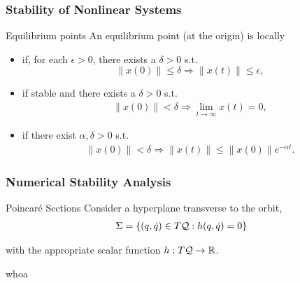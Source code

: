 \begin{frame}
  \frametitle{Stability of Nonlinear Systems}
  \begin{block}{Equilibrium points}
    An equilibrium point (at the origin) is locally
    \begin{itemize}
      \item {} if, for each $\epsilon > 0$, there exists a $\delta > 0$ s.t. $$\|x(0)\| \leq \delta  \Rightarrow \|x(t)\| \leq \epsilon,$$
      \item {} if stable and there exists a $\delta > 0$ s.t.
        \begin{align*}
          \|x(0)\| < \delta \Rightarrow \lim_{t \to \infty} x(t) = 0,
        \end{align*}
      \item {} if there exist $\alpha, \delta > 0$ s.t.
        \begin{align*}
          \|x(0)\| < \delta \Rightarrow \| x(t) \| \leq \| x(0) \| e^{-\alpha t}.
        \end{align*}
    \end{itemize}
  \end{block}
\end{frame}

\begin{frame}
  \frametitle{Numerical Stability Analysis}
  \begin{block}{Poincar\'e Sections}
    Consider a hyperplane transverse to the orbit,
    \begin{align*}
      \Sigma = \left\{ (q, {\dot q}) \in T\mathcal{Q} : h(q, \dot q) = 0\right\}
    \end{align*}
  \end{block}
  with the appropriate scalar function $h : T\mathcal{Q} \to \mathbb{R}$.
\end{frame}

\begin{frame}
  whoa
\end{frame}
